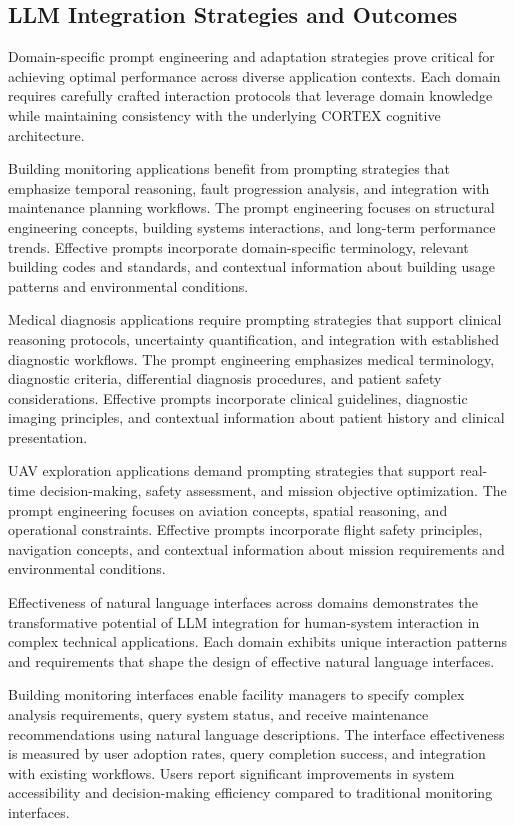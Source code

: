 \subsection{LLM Integration Strategies and Outcomes}

Domain-specific prompt engineering and adaptation strategies prove critical for achieving optimal performance across diverse application contexts. Each domain requires carefully crafted interaction protocols that leverage domain knowledge while maintaining consistency with the underlying CORTEX cognitive architecture.

Building monitoring applications benefit from prompting strategies that emphasize temporal reasoning, fault progression analysis, and integration with maintenance planning workflows. The prompt engineering focuses on structural engineering concepts, building systems interactions, and long-term performance trends. Effective prompts incorporate domain-specific terminology, relevant building codes and standards, and contextual information about building usage patterns and environmental conditions.

Medical diagnosis applications require prompting strategies that support clinical reasoning protocols, uncertainty quantification, and integration with established diagnostic workflows. The prompt engineering emphasizes medical terminology, diagnostic criteria, differential diagnosis procedures, and patient safety considerations. Effective prompts incorporate clinical guidelines, diagnostic imaging principles, and contextual information about patient history and clinical presentation.

UAV exploration applications demand prompting strategies that support real-time decision-making, safety assessment, and mission objective optimization. The prompt engineering focuses on aviation concepts, spatial reasoning, and operational constraints. Effective prompts incorporate flight safety principles, navigation concepts, and contextual information about mission requirements and environmental conditions.

Effectiveness of natural language interfaces across domains demonstrates the transformative potential of LLM integration for human-system interaction in complex technical applications. Each domain exhibits unique interaction patterns and requirements that shape the design of effective natural language interfaces.

Building monitoring interfaces enable facility managers to specify complex analysis requirements, query system status, and receive maintenance recommendations using natural language descriptions. The interface effectiveness is measured by user adoption rates, query completion success, and integration with existing workflows. Users report significant improvements in system accessibility and decision-making efficiency compared to traditional monitoring interfaces.


